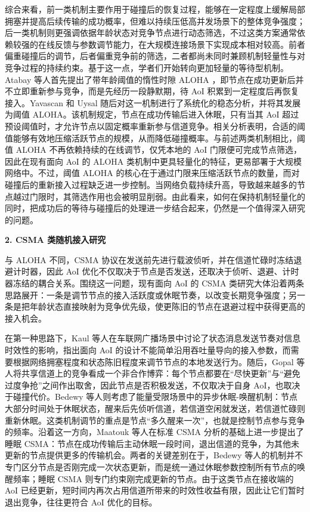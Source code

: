 综合来看，前一类机制主要作用于碰撞后的恢复过程，能够在一定程度上缓解局部拥塞并提高后续传输的成功概率，但难以持续压低高并发场景下的整体竞争强度；后一类机制则更强调依据年龄状态对竞争节点进行动态筛选，不过这类方案通常依赖较强的在线反馈与参数调节能力，在大规模连接场景下实现成本相对较高。前者偏重碰撞后的调节，后者偏重竞争前的筛选，二者都尚未同时兼顾机制轻量性与对竞争过程的持续约束。基于这一点，学者们开始转向更加轻量的等待型机制。Atabay 等人首先提出了带年龄阈值的惰性时隙 ALOHA ，即节点在成功更新后并不立即重新参与竞争，而是先经历一段静默期，待 AoI 积累到一定程度后再恢复接入\cite{atabay2020improving}。Yavascan 和 Uysal 随后对这一机制进行了系统化的稳态分析，并将其发展为阈值 ALOHA\cite{yavascan2021analysis}。该机制规定，节点在成功传输后进入休眠，只有当其 AoI 超过预设阈值时，才允许节点以固定概率重新参与信道竞争。相关分析表明，合适的阈值能够有效地压缩活跃节点的规模，从而降低碰撞概率。与前述两类机制相比，阈值 ALOHA 不再依赖持续的在线调节，仅凭本地的 AoI 门限便可完成节点筛选，因此在现有面向 AoI 的 ALOHA 类机制中更具轻量化的特征，更易部署于大规模网络中。不过，阈值 ALOHA 的核心在于通过门限来压缩活跃节点的数量，而对碰撞后的重新接入过程缺乏进一步控制。当网络负载持续升高，导致越来越多的节点越过门限时，其筛选作用也会被明显削弱。由此看来，如何在保持机制轻量化的同时，把成功后的等待与碰撞后的处理进一步结合起来，仍然是一个值得深入研究的问题。


\textbf{2. CSMA 类随机接入研究}

与 ALOHA 不同，CSMA 协议在发送前先进行载波侦听，并在信道忙碌时冻结退避计时器，因此 AoI 优化不仅取决于节点是否发送，还取决于侦听、退避、计时器冻结的耦合关系。围绕这一问题，现有面向 AoI 的 CSMA 类研究大体沿着两条思路展开：一条是调节节点的接入活跃度或休眠节奏，以改变长期竞争强度；另一条是把年龄状态直接映射为竞争优先级，使更陈旧的节点在退避过程中获得更高的接入机会。

在第一种思路下，Kaul 等人在车联网广播场景中讨论了状态消息发送节奏对信息时效性的影响，指出面向 AoI 的设计不能简单沿用吞吐量导向的接入参数，而需要根据网络拥塞程度和状态陈旧程度来调节节点的本地发送行为\cite{kaul2011minimizing}。随后，Gopal 等人将共享信道上的竞争看成一个非合作博弈：每个节点都要在“尽快更新”与“避免过度争抢”之间作出取舍，因此节点是否积极发送，不仅取决于自身 AoI，也取决于碰撞代价\cite{gopal2020non}。Bedewy 等人则考虑了能量受限场景中的异步休眠-唤醒机制：节点大部分时间处于休眠状态，醒来后先侦听信道，若信道空闲就发送，若信道忙碌则重新休眠\cite{bedewy2021low}。这类机制调节的重点是节点“多久醒来一次”，也就是控制节点参与竞争的频率。沿着这一方向，Maatouk 等人在标准 CSMA 分析的基础上进一步提出了睡眠 CSMA：节点在成功传输后主动休眠一段时间，退出信道的竞争，为其他未更新的节点提供更多的传输机会。两者的关键差别在于，Bedewy 等人的机制并不专门区分节点是否刚完成一次状态更新，而是统一通过休眠参数控制所有节点的唤醒频率；睡眠 CSMA 则专门约束刚完成更新的节点。由于这类节点在接收端的 AoI 已经更新，短时间内再次占用信道所带来的时效性收益有限，因此让它们暂时退出竞争，往往更符合 AoI 优化的目标。

